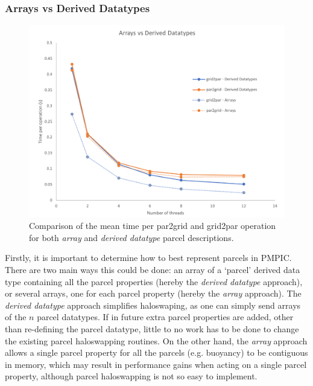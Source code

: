 \documentclass{article}
\begin{document}
\subsubsection{Arrays vs Derived Datatypes}
\begin{figure}
  \begin{center}
    \includegraphics[scale=0.5]{pmpic_images/grid2par.png}
    \caption{Comparison of the mean time per par2grid and grid2par operation for both \emph{array} and \emph{derived datatype} parcel descriptions.\label{grid2par_comp}}
  \end{center}
\end{figure}
Firstly, it is important to determine how to best represent parcels in PMPIC. There are two main ways this could be done: an array of a `parcel' derived data type containing all the parcel properties (hereby the \emph{derived datatype} approach), or several arrays, one for each parcel property (hereby the \emph{array} approach). The \emph{derived datatype} approach simplifies haloswaping, as one can simply send arrays of the $n$ parcel datatypes. If in future extra parcel properties are added, other than re-defining the parcel datatype, little to no work has to be done to change the existing parcel haloswapping routines. On the other hand, the \emph{array} approach allows a single parcel property for all the parcels (e.g. buoyancy) to be contiguous in memory, which may result in performance gains when acting on a single parcel property, although parcel haloswapping is not so easy to implement.
\end{document}

